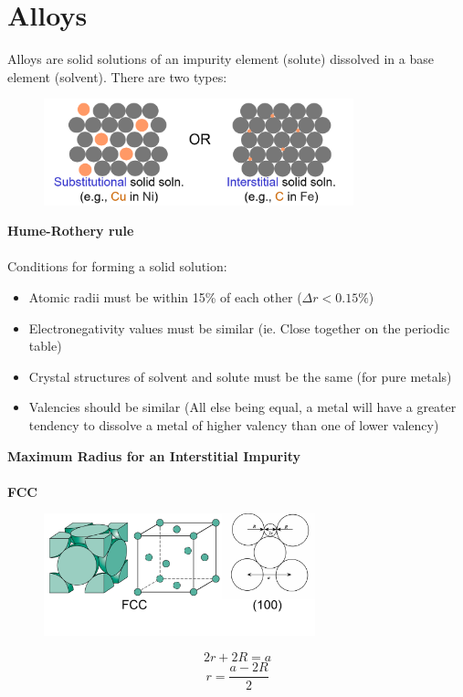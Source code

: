 \documentclass[12pt]{article}
\begin{document}
\section*{Alloys}
Alloys are solid solutions of an impurity element (solute) dissolved in a base element (solvent). There are two types:
\begin{figure}[H]
    \centering
    \includegraphics[width=0.8\textwidth]{alloy.png}
\end{figure}
\noindent\textbf{Hume-Rothery rule}\\\\
Conditions for forming a solid solution:
\begin{itemize}
    \item Atomic radii must be within 15\% of each other ($\Delta r < 0.15\%$)
    \item Electronegativity values must be similar (ie. Close together on the periodic table)
    \item Crystal structures of solvent and solute must be the same (for pure metals)
    \item Valencies should be similar (All else being equal, a metal will have a greater tendency to dissolve a metal of higher valency than one of lower valency)
\end{itemize}
\newpage
\noindent\textbf{Maximum Radius for an Interstitial Impurity}\\\\
\noindent\textbf{FCC}
\begin{figure}[H]
    \centering
    \includegraphics[width=0.7\textwidth]{FCC radius.png}
\end{figure}
\vspace{-4em}
\[2r+2R=a\]
\[r=\frac{a-2R}{2}\]
\end{document}
